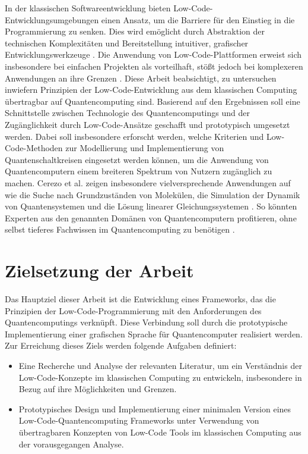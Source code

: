 In der klassischen Softwareentwicklung bieten Low-Code-Entwicklungsumgebungen einen Ansatz, um
die Barriere für den Einstieg in die Programmierung zu senken. Dies wird
emöglicht durch Abstraktion der technischen Komplexitäten und
Bereitstellung intuitiver, grafischer Entwicklungswerkzeuge \cite{Juhas2022}. Die
Anwendung von Low-Code-Plattformen erweist sich insbesondere bei
einfachen Projekten als vorteilhaft, stößt jedoch bei komplexeren
Anwendungen an ihre Grenzen \cite{Buscher2022}. Diese Arbeit beabsichtigt, zu
untersuchen inwiefern Prinzipien der Low-Code-Entwicklung aus dem
klassischen Computing übertragbar auf Quantencomputing sind. Basierend
auf den Ergebnissen soll eine Schnittstelle zwischen Technologie des
Quantencomputings und der Zugänglichkeit durch Low-Code-Ansätze
geschafft und prototypisch umgesetzt werden. Dabei soll insbesondere
erforscht werden, welche Kriterien und Low-Code-Methoden zur
Modellierung und Implementierung von Quantenschaltkreisen eingesetzt
werden können, um die Anwendung von Quantencomputern einem breiteren
Spektrum von Nutzern zugänglich zu machen. Cerezo et al. zeigen
insbesondere vielversprechende Anwendungen auf wie die Suche nach
Grundzuständen von Molekülen, die Simulation der Dynamik von
Quantensystemen und die Lösung linearer Gleichungssystemen \cite{Cerezo2021}. So
könnten Experten aus den genannten Domänen von Quantencomputern
profitieren, ohne selbst tieferes Fachwissen im Quantencomputing zu
benötigen \cite{Motta2022}.

\section{Zielsetzung der Arbeit}

Das Hauptziel dieser Arbeit ist die Entwicklung eines Frameworks, das
die Prinzipien der Low-Code-Programmierung mit den Anforderungen des
Quantencomputings verknüpft. Diese Verbindung soll durch die
prototypische Implementierung einer grafischen Sprache für
Quantencomputer realisiert werden. Zur Erreichung dieses Ziels werden
folgende Aufgaben definiert:

\begin{itemize}
\item
  Eine Recherche und Analyse der relevanten Literatur, um ein
  Verständnis der Low-Code-Konzepte im klassischen Computing zu
  entwickeln, insbesondere in Bezug auf ihre Möglichkeiten und Grenzen.
\item
  Prototypisches Design und Implementierung einer minimalen Version
  eines Low-Code-Quantencomputing Frameworks unter Verwendung von
  übertragbaren Konzepten von Low-Code Tools im klassischen Computing
  aus der vorausgegangen Analyse.
\end{itemize}

